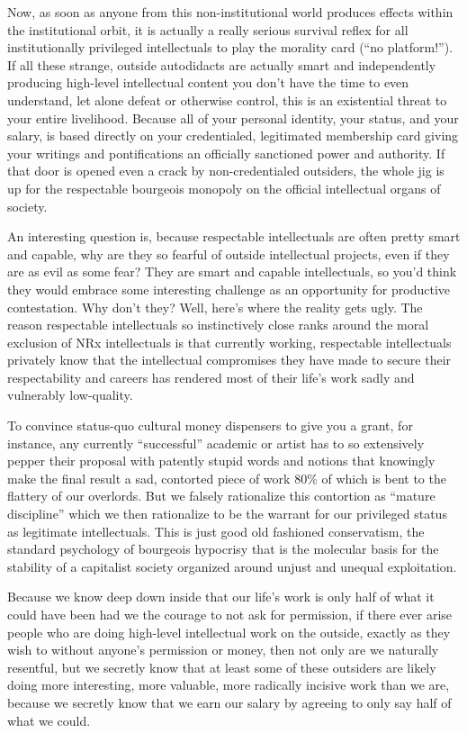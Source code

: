 \documentclass[a4paper,12pt,margin=.5in]{article}
\begin{document}
Now, as soon as anyone from this non-institutional world produces
effects within the institutional orbit, it is actually a really serious
survival reflex for all institutionally privileged intellectuals to play
the morality card (``no platform!''). If all these strange, outside
autodidacts are actually smart and independently producing high-level
intellectual content you don't have the time to even understand, let
alone defeat or otherwise control, this is an existential threat to your
entire livelihood. Because all of your personal identity, your status,
and your salary, is based directly on your credentialed, legitimated
membership card giving your writings and pontifications an officially
sanctioned power and authority. If that door is opened even a crack by
non-credentialed outsiders, the whole jig is up for the respectable
bourgeois monopoly on the official intellectual organs of society.

An interesting question is, because respectable intellectuals are often
pretty smart and capable, why are they so fearful of outside
intellectual projects, even if they are as evil as some fear? They are
smart and capable intellectuals, so you'd think they would embrace some
interesting challenge as an opportunity for productive contestation. Why
don't they? Well, here's where the reality gets ugly. The reason
respectable intellectuals so instinctively close ranks around the moral
exclusion of NRx intellectuals is that currently working, respectable
intellectuals privately know that the intellectual compromises they have
made to secure their respectability and careers has rendered most of
their life's work sadly and vulnerably low-quality.

To convince status-quo cultural money dispensers to give you a grant,
for instance, any currently ``successful'' academic or artist has to so
extensively pepper their proposal with patently stupid words and notions
that knowingly make the final result a sad, contorted piece of work 80\%
of which is bent to the flattery of our overlords. But we falsely
rationalize this contortion as ``mature discipline'' which we then
rationalize to be the warrant for our privileged status as legitimate
intellectuals. This is just good old fashioned conservatism, the
standard psychology of bourgeois hypocrisy that is the molecular basis
for the stability of a capitalist society organized around unjust and
unequal exploitation.

Because we know deep down inside that our life's work is only half of
what it could have been had we the courage to not ask for permission, if
there ever arise people who are doing high-level intellectual work on
the outside, exactly as they wish to without anyone's permission or
money, then not only are we naturally resentful, but we secretly know
that at least some of these outsiders are likely doing more interesting,
more valuable, more radically incisive work than we are, because we
secretly know that we earn our salary by agreeing to only say half of
what we could.
\end{document}
